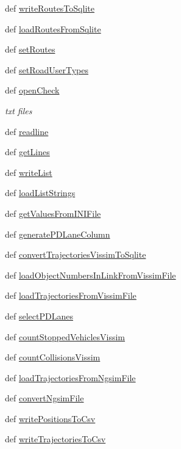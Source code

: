 \begin{DoxyCompactItemize}
\item 
def \hyperlink{namespacestorage_aaa338d6a4ccd90e945b7437eb30cc924}{write\-Routes\-To\-Sqlite}
\item 
def \hyperlink{namespacestorage_a5ce415981ee6ec6ad4b5c5a0cb001d0c}{load\-Routes\-From\-Sqlite}
\item 
def \hyperlink{namespacestorage_a155d0588761fc29ed1a779828d4c35aa}{set\-Routes}
\item 
def \hyperlink{namespacestorage_a6f7261211ea6f4630d1b420002476965}{set\-Road\-User\-Types}
\item 
def \hyperlink{namespacestorage_ad83a9b3ef476a0684e7cc4875a77f040}{open\-Check}
\begin{DoxyCompactList}\small\item\em txt files \end{DoxyCompactList}\item 
def \hyperlink{namespacestorage_ad761369ba46515c3320e69c6f00005c7}{readline}
\item 
def \hyperlink{namespacestorage_ae247cceb087024add485a77083a1a56e}{get\-Lines}
\item 
def \hyperlink{namespacestorage_a6b6a8e076dbfeb2a58276580dbd1cf22}{write\-List}
\item 
def \hyperlink{namespacestorage_a0f0547d87b19e2058726a664b1603656}{load\-List\-Strings}
\item 
def \hyperlink{namespacestorage_ae0081e0622a826698f508a817bef2168}{get\-Values\-From\-I\-N\-I\-File}
\item 
def \hyperlink{namespacestorage_ab141829f9e37048d81355b86b03d0b37}{generate\-P\-D\-Lane\-Column}
\item 
def \hyperlink{namespacestorage_a1f30448e95a5610c23273987207a44ce}{convert\-Trajectories\-Vissim\-To\-Sqlite}
\item 
def \hyperlink{namespacestorage_ac915447c57143c14e9d65aa502fb4d25}{load\-Object\-Numbers\-In\-Link\-From\-Vissim\-File}
\item 
def \hyperlink{namespacestorage_a1c4b7cd48f54bacdb288c016df3679cf}{load\-Trajectories\-From\-Vissim\-File}
\item 
def \hyperlink{namespacestorage_a39d23aecd72e8ee0687e5e40575b9440}{select\-P\-D\-Lanes}
\item 
def \hyperlink{namespacestorage_ad36db487f724a6c0f21b0d7368b93ed8}{count\-Stopped\-Vehicles\-Vissim}
\item 
def \hyperlink{namespacestorage_acc50460f4328c5352f4848bcec1fd623}{count\-Collisions\-Vissim}
\item 
def \hyperlink{namespacestorage_aceb41b1916ee41e1ae9636be5c534843}{load\-Trajectories\-From\-Ngsim\-File}
\item 
def \hyperlink{namespacestorage_a0e9e8101e2b13493836b0cfb8af37ac2}{convert\-Ngsim\-File}
\item 
def \hyperlink{namespacestorage_a80983eb1319df80f34a90edb4b834c12}{write\-Positions\-To\-Csv}
\item 
def \hyperlink{namespacestorage_a8deefcfaae5e90f26abfd0c03adf8cce}{write\-Trajectories\-To\-Csv}
\end{DoxyCompactItemize}
